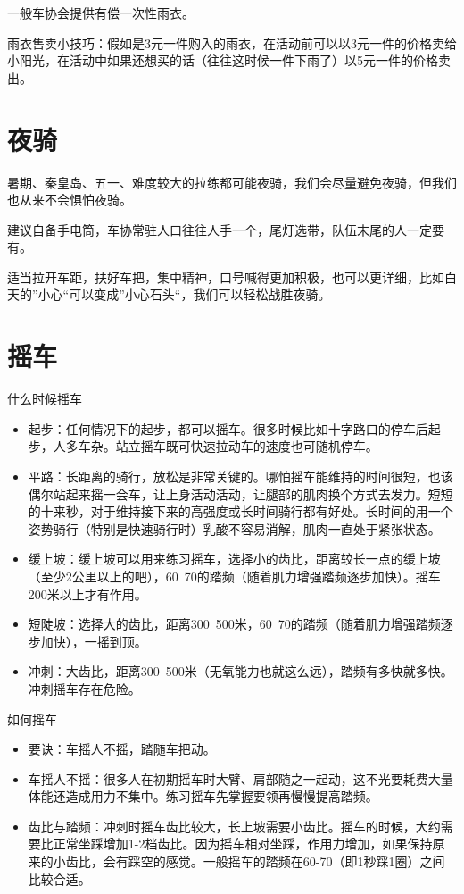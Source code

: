 \documentclass{ctexbook}
\begin{document}
一般车协会提供有偿一次性雨衣。

雨衣售卖小技巧：假如是3元一件购入的雨衣，在活动前可以以3元一件的价格卖给小阳光，在活动中如果还想买的话（往往这时候一件下雨了）以5元一件的价格卖出。
\section{夜骑}
暑期、秦皇岛、五一、难度较大的拉练都可能夜骑，我们会尽量避免夜骑，但我们也从来不会惧怕夜骑。

建议自备手电筒，车协常驻人口往往人手一个，尾灯选带，队伍末尾的人一定要有。

适当拉开车距，扶好车把，集中精神，口号喊得更加积极，也可以更详细，比如白天的''小心``可以变成''小心石头``，我们可以轻松战胜夜骑。


\section{摇车}
什么时候摇车
\begin{itemize}
\item 起步：任何情况下的起步，都可以摇车。很多时候比如十字路口的停车后起步，人多车杂。站立摇车既可快速拉动车的速度也可随机停车。
\item 平路：长距离的骑行，放松是非常关键的。哪怕摇车能维持的时间很短，也该偶尔站起来摇一会车，让上身活动活动，让腿部的肌肉换个方式去发力。短短的十来秒，对于维持接下来的高强度或长时间骑行都有好处。长时间的用一个姿势骑行（特别是快速骑行时）乳酸不容易消解，肌肉一直处于紧张状态。
\item 缓上坡：缓上坡可以用来练习摇车，选择小的齿比，距离较长一点的缓上坡（至少2公里以上的吧），60~70的踏频（随着肌力增强踏频逐步加快）。摇车200米以上才有作用。
\item 短陡坡：选择大的齿比，距离300~500米，60~70的踏频（随着肌力增强踏频逐步加快），一摇到顶。
\item 冲刺：大齿比，距离300~500米（无氧能力也就这么远），踏频有多快就多快。冲刺摇车存在危险。
\end{itemize}
如何摇车
\begin{itemize}
\item 要诀：车摇人不摇，踏随车把动。
\item 车摇人不摇：很多人在初期摇车时大臂、肩部随之一起动，这不光要耗费大量体能还造成用力不集中。练习摇车先掌握要领再慢慢提高踏频。
\item 齿比与踏频：冲刺时摇车齿比较大，长上坡需要小齿比。摇车的时候，大约需要比正常坐踩增加1-2档齿比。因为摇车相对坐踩，作用力增加，如果保持原来的小齿比，会有踩空的感觉。一般摇车的踏频在60-70（即1秒踩1圈）之间比较合适。
\end{itemize}
\end{document}
